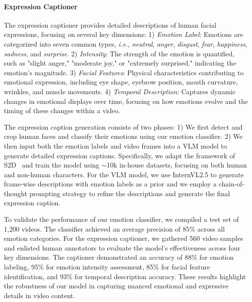 \documentclass{article}
\begin{document}
{\paragraph{Expression Captioner}
The expression captioner provides detailed descriptions of human facial expressions, focusing on several key dimensions: 1) \emph{Emotion Label}: Emotions are categorized into seven common types, \textit{i.e.}, \textit{neutral}, \textit{anger}, \textit{disgust}, \textit{fear}, \textit{happiness}, \textit{sadness}, and \textit{surprise}. 2) \emph{Intensity}: The strength of the emotion is quantified, such as "slight anger," "moderate joy," or "extremely surprised," indicating the emotion's magnitude. 3) \emph{Facial Features}: Physical characteristics contributing to emotional expression, including eye shape, eyebrow position, mouth curvature, wrinkles, and muscle movements. 4) \emph{Temporal Description}: Captures dynamic changes in emotional displays over time, focusing on how emotions evolve and the timing of these changes within a video.

The expression caption generation consists of two phases: 1) We first detect and crop human faces and classify their emotions using our emotion classifier. 2) We then input both the emotion labels and video frames into a VLM model to generate detailed expression captions.
Specifically, we adapt the framework of S2D~\cite{S2D} and train the model using \(\sim\)10k in-house datasets, focusing on both human and non-human characters. For the VLM model, we use InternVL2.5 to generate frame-wise descriptions with emotion labels as a prior and we employ a chain-of-thought prompting strategy to refine the descriptions and generate the final expression caption.


To validate the performance of our emotion classifier, we compiled a test set of 1,200 videos. The classifier achieved an average precision of 85\% across all emotion categories. For the expression captioner, we gathered 560 video samples and enlisted human annotators to evaluate the model's effectiveness across four key dimensions. The captioner demonstrated an accuracy of 88\% for emotion labeling, 95\% for emotion intensity assessment, 85\% for facial feature identification, and 93\% for temporal description accuracy. These results highlight the robustness of our model in capturing nuanced emotional and expressive details in video content.


}
\end{document}
